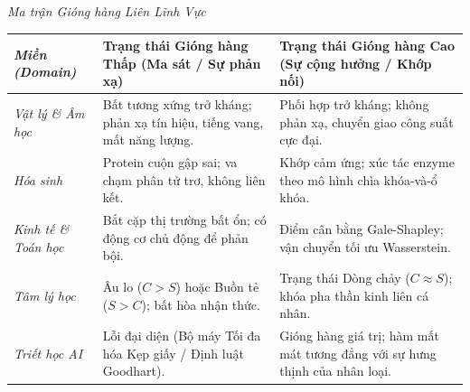 \documentclass[11pt]{article}
\begin{document}
\emph{Ma trận Gióng hàng Liên Lĩnh Vực}
\begin{table}[H]
\centering
\begin{tabular}{@{}p{3cm}p{6cm}p{6cm}@{}}
\toprule
\emph{Miền (Domain)} & \textbf{Trạng thái Gióng hàng Thấp (Ma sát / Sự phản xạ)} & \textbf{Trạng thái Gióng hàng Cao (Sự cộng hưởng / Khớp nối)} \\
\midrule
\emph{Vật lý \& Âm học} & Bất tương xứng trở kháng; phản xạ tín hiệu, tiếng vang, mất năng lượng. & Phối hợp trở kháng; không phản xạ, chuyển giao công suất cực đại. \\

\emph{Hóa sinh} & Protein cuộn gập sai; va chạm phân tử trơ, không liên kết. & Khớp cảm ứng; xúc tác enzyme theo mô hình chìa khóa-và-ổ khóa. \\

\emph{Kinh tế \& Toán học} & Bắt cặp thị trường bất ổn; có động cơ chủ động để phản bội. & Điểm cân bằng Gale-Shapley; vận chuyển tối ưu Wasserstein. \\

\emph{Tâm lý học} & Âu lo ($C > S$) hoặc Buồn tẻ ($S > C$); bất hòa nhận thức. & Trạng thái Dòng chảy ($C \approx S$); khóa pha thần kinh liên cá nhân. \\

\emph{Triết học AI} & Lỗi đại diện (Bộ máy Tối đa hóa Kẹp giấy / Định luật Goodhart). & Gióng hàng giá trị; hàm mất mát tương đẳng với sự hưng thịnh của nhân loại. \\
\bottomrule
\end{tabular}
\end{table}
\end{document}
